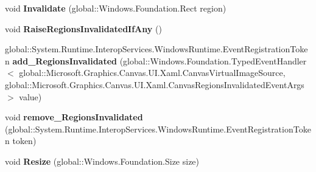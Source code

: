 \begin{DoxyCompactItemize}
\mbox{\label{interface_microsoft_1_1_graphics_1_1_canvas_1_1_u_i_1_1_xaml_1_1_i_canvas_virtual_image_source_a8abbf69a507cfa89ef9d4a6b113d2fbb}} 
void {\bfseries Invalidate} (global\+::\+Windows.\+Foundation.\+Rect region)
\item 
\mbox{\label{interface_microsoft_1_1_graphics_1_1_canvas_1_1_u_i_1_1_xaml_1_1_i_canvas_virtual_image_source_a4a0609ae8d5cff634e5c29e0a749f233}} 
void {\bfseries Raise\+Regions\+Invalidated\+If\+Any} ()
\item 
\mbox{\label{interface_microsoft_1_1_graphics_1_1_canvas_1_1_u_i_1_1_xaml_1_1_i_canvas_virtual_image_source_ad46426bf1b7c4443b87a1e998db5c012}} 
global\+::\+System.\+Runtime.\+Interop\+Services.\+Windows\+Runtime.\+Event\+Registration\+Token {\bfseries add\+\_\+\+Regions\+Invalidated} (global\+::\+Windows.\+Foundation.\+Typed\+Event\+Handler$<$ global\+::\+Microsoft.\+Graphics.\+Canvas.\+U\+I.\+Xaml.\+Canvas\+Virtual\+Image\+Source, global\+::\+Microsoft.\+Graphics.\+Canvas.\+U\+I.\+Xaml.\+Canvas\+Regions\+Invalidated\+Event\+Args $>$ value)
\item 
\mbox{\label{interface_microsoft_1_1_graphics_1_1_canvas_1_1_u_i_1_1_xaml_1_1_i_canvas_virtual_image_source_a46e07a464bbb440ccaf5550dea1da55f}} 
void {\bfseries remove\+\_\+\+Regions\+Invalidated} (global\+::\+System.\+Runtime.\+Interop\+Services.\+Windows\+Runtime.\+Event\+Registration\+Token token)
\item 
\mbox{\label{interface_microsoft_1_1_graphics_1_1_canvas_1_1_u_i_1_1_xaml_1_1_i_canvas_virtual_image_source_a09dcc1df360a28aaed847abfaa318e7f}} 
void {\bfseries Resize} (global\+::\+Windows.\+Foundation.\+Size size)
\item 
\mbox{\label{interface_microsoft_1_1_graphics_1_1_canvas_1_1_u_i_1_1_xaml_1_1_i_canvas_virtual_image_source_aeae2edb4ee318d5c8112d6d80769828d}} 

\end{DoxyCompactItemize}
